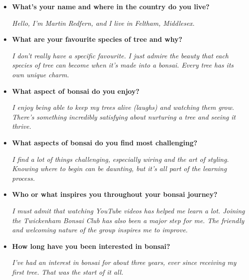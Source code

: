 \begin{itemize}
    \item \textbf{What's your name and where in the country do you live?}
    
    \emph{Hello, I'm Martin Redfern, and I live in Feltham, Middlesex.}

    \item \textbf{What are your favourite species of tree and why?}
    
    \emph{I don't really have a specific favourite. I just admire the beauty that each species of tree can become when it's made into a bonsai. Every tree has its own unique charm.}

    \item \textbf{What aspect of bonsai do you enjoy?}
    
    \emph{I enjoy being able to keep my trees alive (laughs) and watching them grow. There's something incredibly satisfying about nurturing a tree and seeing it thrive.}

    \item \textbf{What aspects of bonsai do you find most challenging?}
    
    \emph{I find a lot of things challenging, especially wiring and the art of styling. Knowing where to begin can be daunting, but it's all part of the learning process.}


    \item \textbf{Who or what inspires you throughout your bonsai journey?}
    
    \emph{I must admit that watching YouTube videos has helped me learn a lot. Joining the Twickenham Bonsai Club has also been a major step for me. The friendly and welcoming nature of the group inspires me to improve.}

    \item \textbf{How long have you been interested in bonsai?}
    
    \emph{I've had an interest in bonsai for about three years, ever since receiving my first tree. That was the start of it all.}



\end{itemize}
